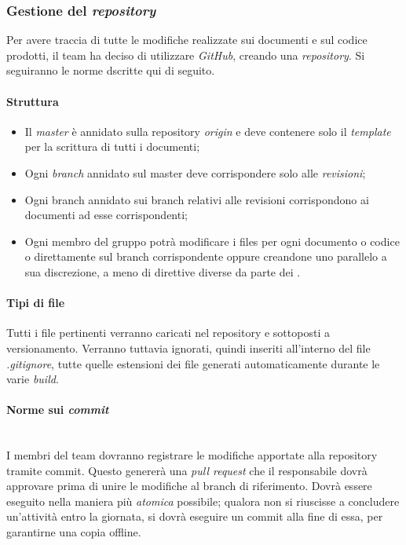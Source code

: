 	
		\subsubsection{Gestione del \emph{repository}}
		Per avere traccia di tutte le modifiche realizzate sui documenti e sul codice prodotti, il team ha deciso di utilizzare \emph{GitHub}, creando una \emph{repository}. Si seguiranno le norme dscritte qui di seguito.
			\paragraph{Struttura}
			\begin{itemize}
				\item Il \emph{master} è annidato sulla repository \emph{origin} e deve contenere solo il \emph{template} per la scrittura di tutti i documenti;
				\item Ogni \emph{branch} annidato sul master deve corrispondere solo alle \emph{revisioni};
				\item Ogni branch annidato sui branch relativi alle revisioni corrispondono ai documenti ad esse corrispondenti;
				\item Ogni membro del gruppo potrà modificare i files per ogni documento o codice o direttamente sul branch corrispondente oppure creandone uno parallelo a sua discrezione, a meno di direttive diverse da parte dei \progs{}.
			\end{itemize}
			\paragraph{Tipi di file}
			Tutti i file pertinenti verranno caricati nel repository e sottoposti a versionamento. Verranno tuttavia ignorati, quindi inseriti all'interno del file \emph{.gitignore}, tutte quelle estensioni dei file generati automaticamente durante le varie \emph{build}.
			\paragraph{Norme sui \emph{commit}}
			~\\I membri del team dovranno registrare le modifiche apportate alla repository tramite commit. Questo genererà una \emph{pull request} che il responsabile dovrà approvare prima di unire le modifiche al branch di riferimento. Dovrà essere eseguito nella maniera più \emph{atomica} possibile; qualora non si riuscisse a concludere un'attività entro la giornata, si dovrà eseguire un commit alla fine di essa, per garantirne una copia offline.
